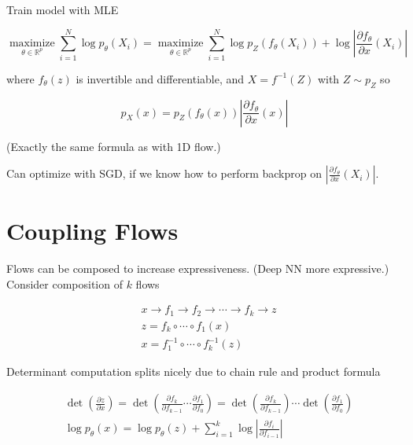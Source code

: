 \begin{definition}
    Train model with MLE

    $$
    \underset{\theta \in \mathbb{R}^{p}}{\operatorname{maximize}} \sum_{i=1}^{N} \log p_{\theta}\left(X_{i}\right)=\underset{\theta \in \mathbb{R}^{p}}{\operatorname{maximize}} \sum_{i=1}^{N} \log p_{Z}\left(f_{\theta}\left(X_{i}\right)\right)+\log \left|\frac{\partial f_{\theta}}{\partial x}\left(X_{i}\right)\right|
    $$

    where $f_{\theta}(z)$ is invertible and differentiable, and $X=f^{-1}(Z)$ with $Z \sim p_{Z}$ so

    $$
    p_{X}(x)=p_{Z}\left(f_{\theta}(x)\right)\left|\frac{\partial f_{\theta}}{\partial x}(x)\right|
    $$

    (Exactly the same formula as with 1D flow.)

    Can optimize with SGD, if we know how to perform backprop on $\left|\frac{\partial f_{\theta}}{\partial x}\left(X_{i}\right)\right|$.
\end{definition}

\section{Coupling Flows}

\begin{concept}
    Flows can be composed to increase expressiveness. (Deep NN more expressive.)
    Consider composition of $k$ flows

    $$
    \begin{aligned}
    & x \rightarrow f_{1} \rightarrow f_{2} \rightarrow \cdots \rightarrow f_{k} \rightarrow z \\
    & z=f_{k} \circ \cdots \circ f_{1}(x) \\
    & x=f_{1}^{-1} \circ \cdots \circ f_{k}^{-1}(z)
    \end{aligned}
    $$

    Determinant computation splits nicely due to chain rule and product formula

    $$
    \begin{aligned}
    & \operatorname{det}\left(\frac{\partial z}{\partial x}\right)=\operatorname{det}\left(\frac{\partial f_{k}}{\partial f_{k-1}} \cdots \frac{\partial f_{1}}{\partial f_{0}}\right)=\operatorname{det}\left(\frac{\partial f_{k}}{\partial f_{k-1}}\right) \cdots \operatorname{det}\left(\frac{\partial f_{1}}{\partial f_{0}}\right) \\
    & \log p_{\theta}(x)=\log p_{\theta}(z)+\sum_{i=1}^{k} \log \left|\frac{\partial f_{i}}{\partial f_{i-1}}\right|
    \end{aligned}
    $$
\end{concept}

